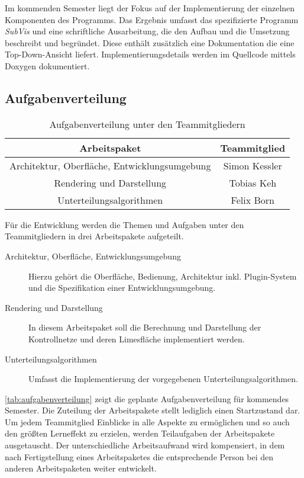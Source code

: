 Im kommenden Semester liegt der Fokus auf der Implementierung der einzelnen Komponenten des Programms.
Das Ergebnis umfasst das spezifizierte Programm \emph{SubVis} und eine schriftliche Ausarbeitung, die den Aufbau und die Umsetzung beschreibt und begründet.
Diese enthält zusätzlich eine Dokumentation die eine Top-Down-Ansicht liefert. 
Implementierungsdetails werden im Quellcode mittels Doxygen dokumentiert.

\subsection{Aufgabenverteilung}

\begin{table}
\center
\caption{Aufgabenverteilung unter den Teammitgliedern}
\begin{tabular}{c|c}
Arbeitspaket & Teammitglied\\
\hline
Architektur, Oberfläche, Entwicklungsumgebung & Simon Kessler \\
Rendering und Darstellung & Tobias Keh \\
Unterteilungsalgorithmen & Felix Born \\
\end{tabular}
\label{tab:aufgabenverteilung}
\end{table}

Für die Entwicklung werden die Themen und Aufgaben unter den Teammitgliedern in drei Arbeitspakete aufgeteilt.

\begin{description}
\item[Architektur, Oberfläche, Entwicklungsumgebung] Hierzu gehört die Oberfläche, Bedienung, Architektur inkl. Plugin-System und die Spezifikation einer Entwicklungsumgebung.
\item[Rendering und Darstellung] In diesem Arbeitspaket soll die Berechnung und Darstellung der Kontrollnetze und deren Limesfläche implementiert werden.
\item[Unterteilungsalgorithmen] Umfasst die Implementierung der vorgegebenen Unterteilungsalgorithmen.
\end{description}

\autoref{tab:aufgabenverteilung} zeigt die geplante Aufgabenverteilung für kommendes Semester.
Die Zuteilung der Arbeitspakete stellt lediglich einen Startzustand dar. 
Um jedem Teammitglied Einblicke in alle Aspekte zu ermöglichen und so auch den größten Lerneffekt zu erzielen, werden Teilaufgaben der Arbeitspakete ausgetauscht.
Der unterschiedliche Arbeitsaufwand wird kompensiert, in dem nach Fertigstellung eines Arbeitspaketes die entsprechende Person bei den anderen Arbeitspaketen weiter entwickelt.

